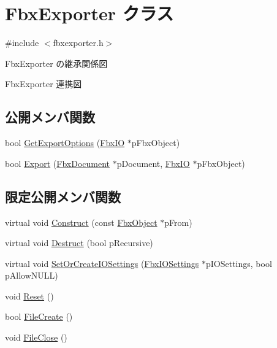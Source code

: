 \hypertarget{class_fbx_exporter}{}\section{Fbx\+Exporter クラス}
\label{class_fbx_exporter}


{\ttfamily \#include $<$fbxexporter.\+h$>$}



Fbx\+Exporter の継承関係図


Fbx\+Exporter 連携図
\subsection*{公開メンバ関数}
\begin{DoxyCompactItemize}
\item 
bool \hyperlink{class_fbx_exporter_a0e26854a47b1fdbc100332b131552b7e}{Get\+Export\+Options} (\hyperlink{class_fbx_i_o}{Fbx\+IO} $\ast$p\+Fbx\+Object)
\item 
bool \hyperlink{class_fbx_exporter_ae14616d7e29cd9ae52cd6bbccd6d6988}{Export} (\hyperlink{class_fbx_document}{Fbx\+Document} $\ast$p\+Document, \hyperlink{class_fbx_i_o}{Fbx\+IO} $\ast$p\+Fbx\+Object)
\end{DoxyCompactItemize}
\subsection*{限定公開メンバ関数}
\begin{DoxyCompactItemize}
\item 
virtual void \hyperlink{class_fbx_exporter_aa308b9a9901e8c98d0b54f0bd20daad2}{Construct} (const \hyperlink{class_fbx_object}{Fbx\+Object} $\ast$p\+From)
\item 
virtual void \hyperlink{class_fbx_exporter_a0a2569f6ed2ffaa165d9bdb1959f0599}{Destruct} (bool p\+Recursive)
\item 
virtual void \hyperlink{class_fbx_exporter_a1684b8488befbd05433963007bbaf3ad}{Set\+Or\+Create\+I\+O\+Settings} (\hyperlink{class_fbx_i_o_settings}{Fbx\+I\+O\+Settings} $\ast$p\+I\+O\+Settings, bool p\+Allow\+N\+U\+LL)
\item 
void \hyperlink{class_fbx_exporter_a2ee7ea29532a88c85f811eff793a5961}{Reset} ()
\item 
bool \hyperlink{class_fbx_exporter_a212dd139e703f6531bb6cf0ba1bc88d9}{File\+Create} ()
\item 
void \hyperlink{class_fbx_exporter_a7802b8f3aaf4598bb8e799d0f2c829be}{File\+Close} ()
\end{DoxyCompactItemize}
